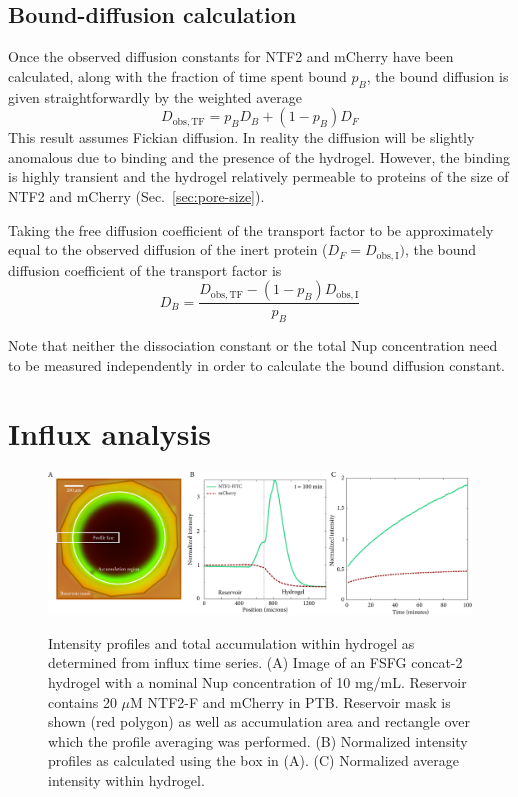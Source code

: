 \subsection{Bound-diffusion calculation}
\label{sec:db-calc}

Once the observed diffusion constants for NTF2 and mCherry have been calculated, along with the fraction of time spent bound $p_B$, the bound diffusion is given straightforwardly by the weighted average
\begin{equation}
D_\mathrm{obs, TF} = p_B D_B + (1-p_B) D_F
\label{eq:weighted-average}
\end{equation}
This result assumes Fickian diffusion.  In reality the diffusion will be slightly anomalous due to binding and the presence of the hydrogel.  However, the binding is highly transient and the hydrogel relatively permeable to proteins of the size of NTF2 and mCherry (Sec.~\ref{sec:pore-size}).

Taking the free diffusion coefficient of the transport factor to be approximately equal to the observed diffusion of the inert protein ($D_F = D_\mathrm{obs,I})$, the bound diffusion coefficient of the transport factor is
\begin{equation}
D_B = \frac{D_\mathrm{obs, TF}-(1-p_B) D_\mathrm{obs,I}}{p_B}
\label{eq:d-bound}
\end{equation}

Note that neither the dissociation constant or the total Nup concentration need to be measured independently in order to calculate the bound diffusion constant.

\section{Influx analysis}
\label{sec:influx-analysis}

\begin{figure}
\caption[Intensity profiles and accumulation curve from influx experiments.]{Intensity profiles and total accumulation within hydrogel as determined from influx time series.  (A) Image of an FSFG concat-2 hydrogel with a nominal Nup concentration of 10 mg/mL. Reservoir contains 20 $\mu$M NTF2-F and mCherry in PTB. Reservoir mask is shown (red polygon) as well as accumulation area and rectangle over which the profile averaging was performed. (B) Normalized intensity profiles as calculated using the box in (A).  (C) Normalized average intensity within hydrogel.}
\centering
\includegraphics[width=\textwidth]{figs/ch04/influx-plots.pdf}
\label{fig:influx-plots}
\end{figure}

